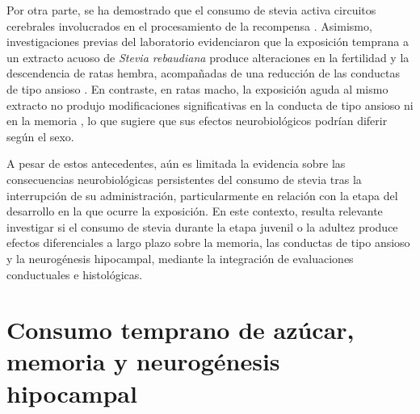 Por otra parte, se ha demostrado que el consumo de stevia activa circuitos cerebrales involucrados en el procesamiento de la recompensa \cite{salinasvelarde2021fosb}. Asimismo, investigaciones previas del laboratorio evidenciaron que la exposición temprana a un extracto acuoso de \textit{Stevia rebaudiana} produce alteraciones en la fertilidad y la descendencia de ratas hembra, acompañadas de una reducción de las conductas de tipo ansioso \cite{kruse2025stevia}. En contraste, en ratas macho, la exposición aguda al mismo extracto no produjo modificaciones significativas en la conducta de tipo ansioso ni en la memoria \cite{coirini2023stevia,marchena2025stevia}, lo que sugiere que sus efectos neurobiológicos podrían diferir según el sexo.

A pesar de estos antecedentes, aún es limitada la evidencia sobre las consecuencias neurobiológicas persistentes del consumo de stevia tras la interrupción de su administración, particularmente en relación con la etapa del desarrollo en la que ocurre la exposición. En este contexto, resulta relevante investigar si el consumo de stevia durante la etapa juvenil o la adultez produce efectos diferenciales a largo plazo sobre la memoria, las conductas de tipo ansioso y la neurogénesis hipocampal, mediante la integración de evaluaciones conductuales e histológicas.

\section{Consumo temprano de azúcar, memoria y neurogénesis hipocampal}\label{sec:azucar-neurogenesis}

